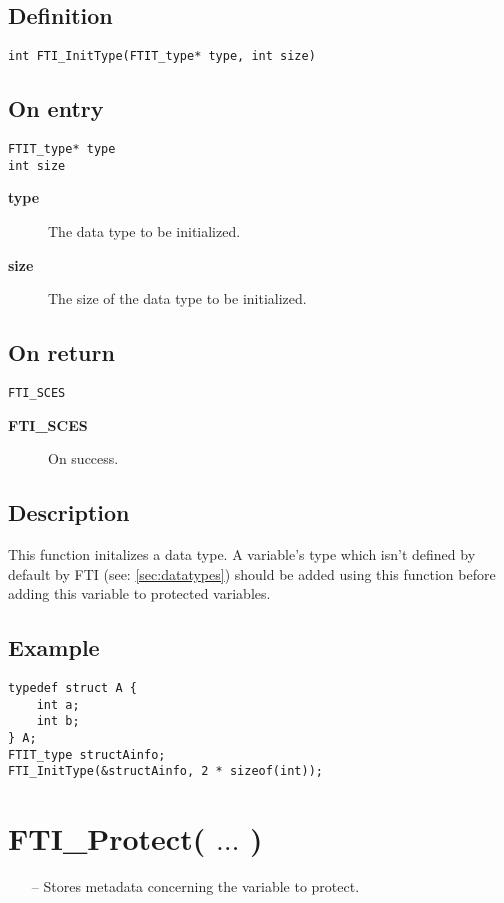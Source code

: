 \documentclass{refrep}
\begin{document}
\subsection*{Definition}
\begin{lstlisting}[frame=single]
int FTI_InitType(FTIT_type* type, int size)
\end{lstlisting}
\subsection*{On entry}
\begin{lstlisting}[frame=single]
FTIT_type* type
int size
\end{lstlisting}
\begin{description}
\item[\textbf{type}] The data type to be initialized.
\item[\textbf{size}] The size of the data type to be initialized.
\end{description}
\subsection*{On return}
\begin{lstlisting}[frame=single]
FTI_SCES
\end{lstlisting}
\begin{description}
\item[\textbf{FTI\_SCES}] On success.
\end{description}
\subsection*{Description}
This function initalizes a data type. A variable's type which isn't defined by default by FTI (see: \ref{sec:datatypes}) should be added using this function before adding this variable to protected variables.
\subsection*{Example}
\begin{center}
\begin{lstlisting}[frame=single]
typedef struct A {
    int a;
    int b;
} A;
FTIT_type structAinfo;
FTI_InitType(&structAinfo, 2 * sizeof(int));
\end{lstlisting}
\end{center}
\newpage
\section{\asciifamily FTI\_Protect( $\dots$ )}\label{sec:ftiprotect}
\begin{framed}
\begin{itemize}
\item[--] Stores metadata concerning the variable to protect.
\end{itemize}
\end{framed}
\end{document}
